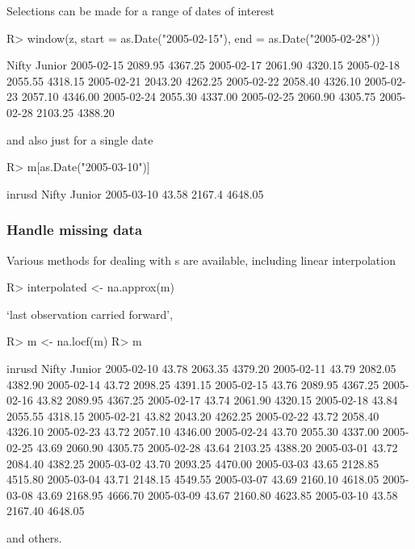 \documentclass[article,nojss]{jss}
\newcommand{\mysection}[1]{\subsubsection[#1]{\textbf{#1}}}
\begin{document}
Selections can be made for a range of dates of interest
\begin{Schunk}
\begin{Sinput}
R> window(z, start = as.Date("2005-02-15"), end = as.Date("2005-02-28"))
\end{Sinput}
\begin{Soutput}
             Nifty  Junior
2005-02-15 2089.95 4367.25
2005-02-17 2061.90 4320.15
2005-02-18 2055.55 4318.15
2005-02-21 2043.20 4262.25
2005-02-22 2058.40 4326.10
2005-02-23 2057.10 4346.00
2005-02-24 2055.30 4337.00
2005-02-25 2060.90 4305.75
2005-02-28 2103.25 4388.20
\end{Soutput}
\end{Schunk}
and also just for a single date
\begin{Schunk}
\begin{Sinput}
R> m[as.Date("2005-03-10")]
\end{Sinput}
\begin{Soutput}
           inrusd  Nifty  Junior
2005-03-10  43.58 2167.4 4648.05
\end{Soutput}
\end{Schunk}

\mysection{Handle missing data}

Various methods for dealing with s are available, including
linear interpolation
\begin{Schunk}
\begin{Sinput}
R> interpolated <- na.approx(m)
\end{Sinput}
\end{Schunk}
`last observation carried forward',
\begin{Schunk}
\begin{Sinput}
R> m <- na.locf(m)
R> m
\end{Sinput}
\begin{Soutput}
           inrusd   Nifty  Junior
2005-02-10  43.78 2063.35 4379.20
2005-02-11  43.79 2082.05 4382.90
2005-02-14  43.72 2098.25 4391.15
2005-02-15  43.76 2089.95 4367.25
2005-02-16  43.82 2089.95 4367.25
2005-02-17  43.74 2061.90 4320.15
2005-02-18  43.84 2055.55 4318.15
2005-02-21  43.82 2043.20 4262.25
2005-02-22  43.72 2058.40 4326.10
2005-02-23  43.72 2057.10 4346.00
2005-02-24  43.70 2055.30 4337.00
2005-02-25  43.69 2060.90 4305.75
2005-02-28  43.64 2103.25 4388.20
2005-03-01  43.72 2084.40 4382.25
2005-03-02  43.70 2093.25 4470.00
2005-03-03  43.65 2128.85 4515.80
2005-03-04  43.71 2148.15 4549.55
2005-03-07  43.69 2160.10 4618.05
2005-03-08  43.69 2168.95 4666.70
2005-03-09  43.67 2160.80 4623.85
2005-03-10  43.58 2167.40 4648.05
\end{Soutput}
\end{Schunk}
and others.
\end{document}
